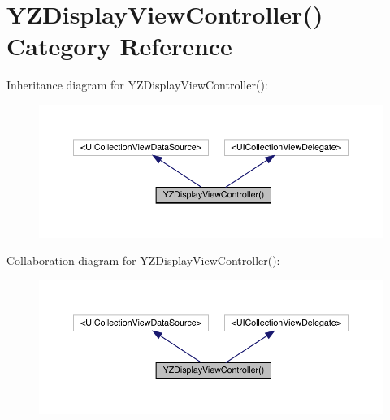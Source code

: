\hypertarget{category_y_z_display_view_controller_07_08}{}\section{Y\+Z\+Display\+View\+Controller() Category Reference}
\label{category_y_z_display_view_controller_07_08}


Inheritance diagram for Y\+Z\+Display\+View\+Controller()\+:\nopagebreak
\begin{figure}[H]
\begin{center}
\leavevmode
\includegraphics[width=350pt]{category_y_z_display_view_controller_07_08__inherit__graph}
\end{center}
\end{figure}


Collaboration diagram for Y\+Z\+Display\+View\+Controller()\+:\nopagebreak
\begin{figure}[H]
\begin{center}
\leavevmode
\includegraphics[width=350pt]{category_y_z_display_view_controller_07_08__coll__graph}
\end{center}
\end{figure}
